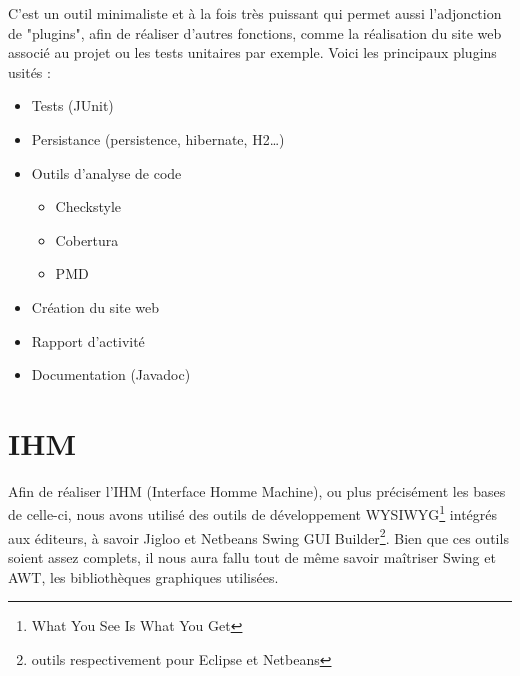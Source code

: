 C’est un outil minimaliste et à la fois très puissant qui permet aussi l’adjonction de "plugins", afin de réaliser d’autres fonctions, comme la réalisation du site web associé au projet ou les tests unitaires par exemple.
Voici les principaux plugins usités :
\begin{itemize}
\item Tests (JUnit)
\item Persistance (persistence, hibernate, H2…)
\item Outils d’analyse de code
	\begin{itemize}
	\item Checkstyle
	\item Cobertura 
	\item PMD
	\end{itemize}
\item Création du site web
\item Rapport d’activité
\item Documentation (Javadoc)
\end{itemize}

\section{IHM}

Afin de réaliser l’IHM (Interface Homme Machine), ou plus précisément les bases de celle-ci, nous avons utilisé des outils de développement WYSIWYG\footnote{What You See Is What You Get} intégrés aux éditeurs, à savoir Jigloo et Netbeans Swing GUI Builder\footnote{outils respectivement pour Eclipse et Netbeans}.
Bien que ces outils soient assez complets, il nous aura fallu tout de même savoir maîtriser Swing et AWT, les bibliothèques graphiques utilisées.
